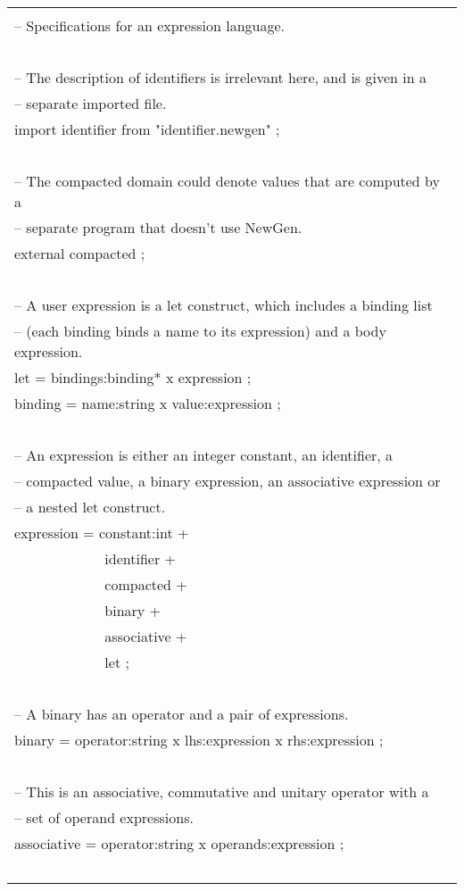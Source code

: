 {\tt
\begin{center}
\begin{tabular}{|l|}
\hline \\
-- Specifications for an expression language. \\
~\\
-- The description of identifiers is irrelevant here, and is given in a \\
-- separate imported file. \\
import identifier from "identifier.newgen" ; \\
~\\
-- The compacted domain could denote values that are computed by a \\ 
-- separate program that doesn't use NewGen. \\
external compacted ; \\
~\\
-- A user expression is a let construct, which includes a binding list \\
-- (each binding binds a name to its expression) and a body expression. \\
let = bindings:binding* x expression ; \\
binding = name:string x value:expression ; \\
~\\
-- An expression is either an integer constant, an identifier, a \\
-- compacted value, a binary expression, an associative expression or \\
-- a nested let construct. \\
expression = constant:int + \\
~~~~~~~~~~~~    identifier + \\
~~~~~~~~~~~~     compacted + \\
~~~~~~~~~~~~     binary + \\
~~~~~~~~~~~~     associative + \\
~~~~~~~~~~~~     let ; \\
~\\
-- A binary has an operator and a pair of expressions. \\
binary = operator:string x lhs:expression x rhs:expression ; \\
~\\
-- This is an associative, commutative and unitary operator with a \\
-- set of operand expressions. \\
associative = operator:string x operands:expression{} ; \\
~ \\
\hline
\end{tabular}
\end{center}
}

